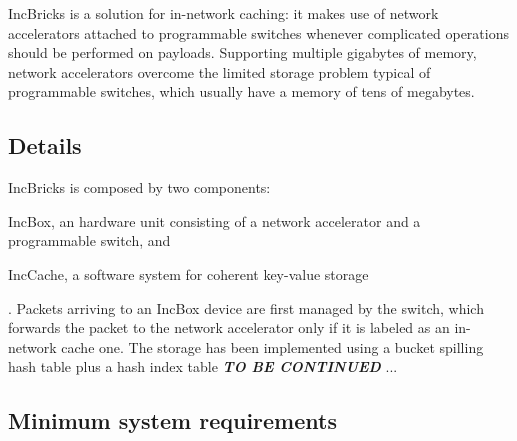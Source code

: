 IncBricks \cite{incbricks} is a solution for in-network caching: it makes use of network accelerators attached to programmable switches whenever complicated operations should be performed on payloads.
Supporting multiple gigabytes of memory, network accelerators overcome the limited storage problem typical of programmable switches, which usually have a memory of tens of megabytes.

\subsection{Details}
IncBricks \cite{incbricks} is composed by two components:
\begin{mylist}
    \item IncBox, an hardware unit consisting of a network accelerator and a programmable switch, and
    \item IncCache, a software system for coherent key-value storage
\end{mylist}.
Packets arriving to an IncBox device are first managed by the switch, which forwards the packet to the network accelerator only if it is labeled as an in-network cache one.
The storage has been implemented using a bucket spilling hash table plus a hash index table
\textbf{\textit{TO BE CONTINUED}} ...

\subsection{Minimum system requirements}